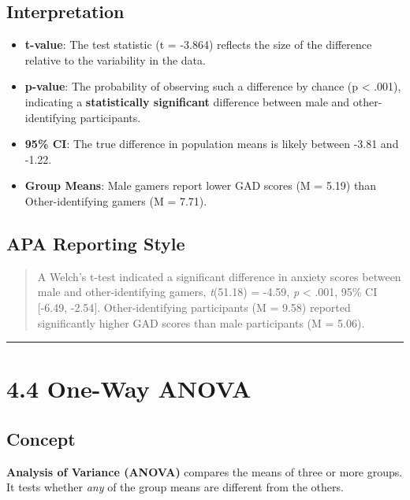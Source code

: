 \documentclass[
]{book}
\providecommand{\tightlist}{%
  \setlength{\itemsep}{0pt}\setlength{\parskip}{0pt}}
\begin{document}
\subsection{Interpretation}\label{interpretation-3}

\begin{itemize}
\tightlist
\item
  \textbf{t-value}: The test statistic (t = -3.864) reflects the size of the difference relative to the variability in the data.
\item
  \textbf{p-value}: The probability of observing such a difference by chance (p \textless{} .001), indicating a \textbf{statistically significant} difference between male and other-identifying participants.
\item
  \textbf{95\% CI}: The true difference in population means is likely between -3.81 and -1.22.
\item
  \textbf{Group Means}: Male gamers report lower GAD scores (M = 5.19) than Other-identifying gamers (M = 7.71).
\end{itemize}

\subsection{APA Reporting Style}\label{apa-reporting-style}

\begin{quote}
A Welch's t-test indicated a significant difference in anxiety scores between male and other-identifying gamers, \emph{t}(51.18) = -4.59, \emph{p} \textless{} .001, 95\% CI {[}-6.49, -2.54{]}. Other-identifying participants (M = 9.58) reported significantly higher GAD scores than male participants (M = 5.06).
\end{quote}

\begin{center}\rule{0.5\linewidth}{0.5pt}\end{center}

\section{4.4 One-Way ANOVA}\label{one-way-anova}

\subsection{Concept}\label{concept-3}

\textbf{Analysis of Variance (ANOVA)} compares the means of three or more groups. It tests whether \emph{any} of the group means are different from the others.
\end{document}
